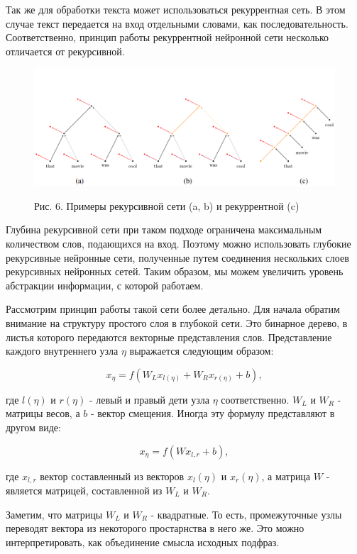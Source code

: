 \documentclass[14pt]{article}
\begin{document}
Так же для обработки текста может использоваться рекуррентная сеть. В этом случае текст передается на вход отдельными словами, как последовательность. Соответственно, принцип работы рекуррентной нейронной сети несколько отличается от рекурсивной.
\pagebreak
\begin{figure}[!h]
    \centering
        \includegraphics[width=16cm]{Fig6.png}
    \parbox[t][1.2cm][c]{16cm}{
        \centering
        Рис. 6. Примеры рекурсивной сети (a, b) и рекуррентной (c)
    }
\end{figure}


Глубина рекурсивной сети при таком подходе ограничена максимальным количеством слов, подающихся на вход. Поэтому можно использовать глубокие рекурсивные нейронные сети, полученные путем соединения нескольких слоев рекурсивных нейронных сетей. Таким образом, мы можем увеличить уровень абстракции информации, с которой работаем.


Рассмотрим принцип работы такой сети более детально. Для начала обратим внимание на структуру простого слоя в глубокой сети. Это бинарное дерево, в листья которого передаются векторные представления слов. Представление каждого внутреннего узла $\eta$ выражается следующим образом:


\begin{equation}
x_\eta=f(W_Lx_{l(\eta)} + W_Rx_{r(\eta)} + b),
\end{equation}


где $l(\eta)$ и $r(\eta)$ - левый и правый дети узла $\eta$ соответственно. $W_L$ и $W_R$ - матрицы весов, а $b$ - вектор смещения. Иногда эту формулу представляют в другом виде:


\begin{equation}
x_\eta=f(Wx_{l, r} + b),
\end{equation}

где $x_{l, r}$ вектор составленный из векторов $x_l(\eta)$ и $x_r(\eta)$, а матрица $W$ - является матрицей, составленной из $W_L$ и $W_R$.


Заметим, что матрицы $W_L$ и $W_R$ - квадратные. То есть, промежуточные узлы переводят вектора из некоторого простарнства в него же. Это можно интерпретировать, как объединение смысла исходных подфраз.
\end{document}
